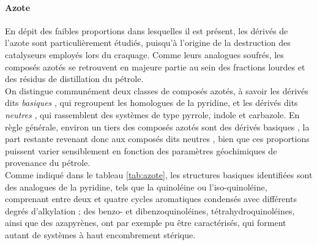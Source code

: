 \paragraph{Azote}
En dépit des faibles proportions dans lesquelles il est présent, les dérivés de l'azote sont particulièrement étudiés, puisqu'à l'origine de la destruction des catalyseurs employés lors du craquage. Comme leurs analogues soufrés, les composés azotés se retrouvent en majeure partie au sein des fractions lourdes et des résidus de distillation du pétrole. \\
On distingue communément deux classes de composés azotés, à savoir les dérivés dits \og \textit{basiques} \fg, qui regroupent les homologues de la pyridine, et les dérivés dits \og \textit{neutres} \fg, qui rassemblent des systèmes de type pyrrole, indole et carbazole.  
En règle générale, environ un tiers des composés azotés sont des dérivés \og basiques \fg{}, la part restante revenant donc aux composés dits \og neutres \fg{}, bien que ces proportions puissent varier sensiblement en fonction des paramètres géochimiques de provenance du pétrole. \\
Comme indiqué dans le tableau \ref{tab:azote}, les structures \og basiques \fg{} identifiées sont des analogues de la pyridine, tels que la quinoléine ou l'iso-quinoléine, comprenant entre deux et quatre cycles aromatiques condensés avec différents degrés d'alkylation ; des benzo- et dibenzoquinoléines, tétrahydroquinoléines, ainsi que des azapyrènes, ont par exemple pu être caractérisés, qui forment autant de systèmes à haut encombrement stérique. \\


